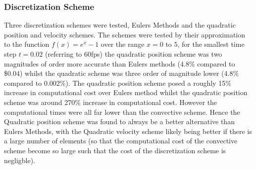 \subsubsection{Discretization Scheme}
Three discretization schemes were tested, Eulers Methods and the quadratic position and velocity schemes. The schemes were tested by their approximation to the function $f(x)=e^x-1$ over the range $x=0$ to $5$, for the smallest time step $t=0.02$ (referring to 60fps) the quadratic position scheme was two magnitudes of order more accurate than Eulers methods (4.8\% compared to \$0.04) whilst the quadratic scheme was three order of magnitude lower (4.8\% compared to 0.002\%). The quadratic position scheme posed a roughly 15\% increase in computational cost over Eulers method whilst the quadratic position scheme was around 270\% increase in computational cost. However the computational times were all far lower than the convective scheme. Hence the Quadratic position scheme was found to always be a better alternative than Eulers Methods, with the Quadratic velocity scheme likely being better if there is a large number of elements (so that the computational cost of the convective scheme become so large such that the cost of the discretization scheme is negligble). 

